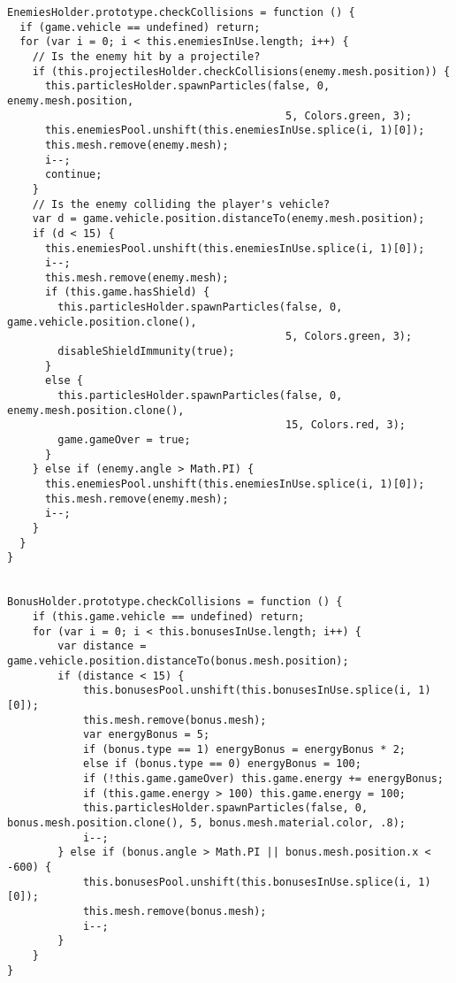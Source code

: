 \documentclass[a4paper,11pt]{article}
\begin{document}
\begin{verbatim}
EnemiesHolder.prototype.checkCollisions = function () {
  if (game.vehicle == undefined) return;
  for (var i = 0; i < this.enemiesInUse.length; i++) {
    // Is the enemy hit by a projectile?
    if (this.projectilesHolder.checkCollisions(enemy.mesh.position)) {
      this.particlesHolder.spawnParticles(false, 0, enemy.mesh.position, 
                                            5, Colors.green, 3);
      this.enemiesPool.unshift(this.enemiesInUse.splice(i, 1)[0]);
      this.mesh.remove(enemy.mesh);
      i--;
      continue;
    }
    // Is the enemy colliding the player's vehicle?
    var d = game.vehicle.position.distanceTo(enemy.mesh.position);
    if (d < 15) {
      this.enemiesPool.unshift(this.enemiesInUse.splice(i, 1)[0]);
      i--;
      this.mesh.remove(enemy.mesh);
      if (this.game.hasShield) {
        this.particlesHolder.spawnParticles(false, 0, game.vehicle.position.clone(),
                                            5, Colors.green, 3);
        disableShieldImmunity(true);
      }
      else {
        this.particlesHolder.spawnParticles(false, 0, enemy.mesh.position.clone(),
                                            15, Colors.red, 3);
        game.gameOver = true;
      }
    } else if (enemy.angle > Math.PI) {
      this.enemiesPool.unshift(this.enemiesInUse.splice(i, 1)[0]);
      this.mesh.remove(enemy.mesh);
      i--;
    }
  }
}


BonusHolder.prototype.checkCollisions = function () {
    if (this.game.vehicle == undefined) return;
    for (var i = 0; i < this.bonusesInUse.length; i++) {
        var distance = game.vehicle.position.distanceTo(bonus.mesh.position);
        if (distance < 15) {
            this.bonusesPool.unshift(this.bonusesInUse.splice(i, 1)[0]);
            this.mesh.remove(bonus.mesh);
            var energyBonus = 5;
            if (bonus.type == 1) energyBonus = energyBonus * 2;
            else if (bonus.type == 0) energyBonus = 100;
            if (!this.game.gameOver) this.game.energy += energyBonus;
            if (this.game.energy > 100) this.game.energy = 100;
            this.particlesHolder.spawnParticles(false, 0, bonus.mesh.position.clone(), 5, bonus.mesh.material.color, .8);
            i--;
        } else if (bonus.angle > Math.PI || bonus.mesh.position.x < -600) {
            this.bonusesPool.unshift(this.bonusesInUse.splice(i, 1)[0]);
            this.mesh.remove(bonus.mesh);
            i--;
        }
    }
}
\end{verbatim}
\end{document}
